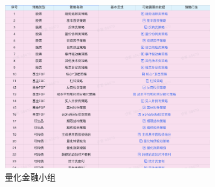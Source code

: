 \documentclass[9pt]{beamer}
\begin{document}
\begin{frame}
\begin{figure}
\centering
\includegraphics[width=9cm]{../fig/量金.png}
\caption{量化金融小组}

\end{figure}
\end{frame}
\end{document}
